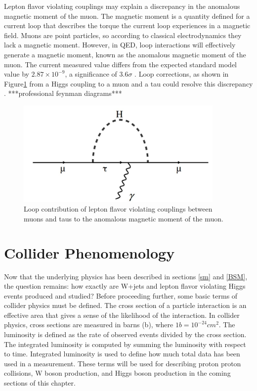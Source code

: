 \documentclass[oneside, letterpaper, oldfontcommands]{memoir}
\begin{document}
\qquad Lepton flavor violating couplings may explain a discrepancy in the anomalous magnetic moment of the muon. The magnetic moment is a quantity defined for a current loop that describes the torque the current loop experiences in a magnetic field. Muons are point particles, so according to classical electrodynamics they lack a magnetic moment. However, in QED, loop interactions will effectively generate a magnetic moment, known as the anomalous magnetic moment of the muon. The current measured value differs from the expected standard model value by $2.87 \times 10^{-9}$, a significance of $3.6 \sigma$ \cite{Bennett:2004pv}\cite{Agashe:2014kda}. Loop corrections, as shown in Figure\ref{fig:mutauloop} from a Higgs coupling to a muon and a tau could resolve this discrepancy \cite{Harnik:2012pb}. ***professional feynman diagrams***

\begin{figure}[here]
\includegraphics[width=0.9\textwidth]{mutauloop.jpg}
\caption{Loop contribution of lepton flavor violating couplings between muons and taus to the anomalous magnetic moment of the muon.}
\label{fig:mutauloop}
\end{figure}

\chapter{Collider Phenomenology}\label{pheno}
Now that the underlying physics has been described in sections \ref{sm} and \ref{BSM}, the question remains: how exactly are W+jets and lepton flavor violating Higgs events produced and studied? Before proceeding further, some basic terms of collider physics must be defined. The cross section of a particle interaction is an effective area that gives a sense of the likelihood of the interaction. In collider physics, cross sections are measured in barns (b), where $1b = 10^{-24}cm^{2}$. The luminosity is defined as the rate of observed events divided by the cross section. The integrated luminosity is computed by summing the luminosity with respect to time. Integrated luminosity is used to define how much total data has been used in a measurement. These terms will be used for describing proton proton collisions, W boson production, and Higgs boson production in the coming sections of this chapter.
\end{document}
